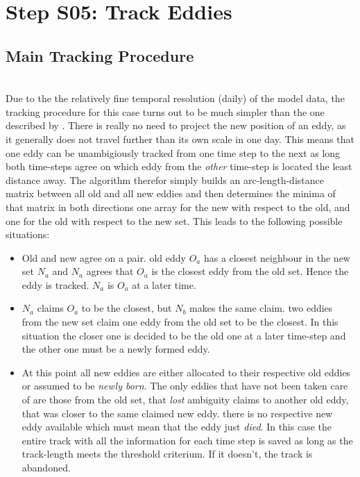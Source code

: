
\section{Step S05: Track Eddies} \label{S:05}
\subsection*{Main Tracking Procedure}
\\
Due to the the relatively fine temporal resolution (daily) of the model data,
the tracking procedure for this case turns out to be much simpler than the one described by
\cite{Chelton2007}. There is really no need to project the new position of an
eddy, as it generally does not travel further than its own scale in one day.
This means that one eddy can be unambigiously tracked from one time step to the
next as long both time-steps agree on which eddy from the \textit{other}
time-step is located the least distance away.
The algorithm therefor simply builds an arc-length-distance matrix
between all old and all new eddies and then determines the minima of that
matrix in both directions \ie one array for the new with respect to the old,
and one for the old with respect to the new set. This leads to the following
possible situations:
\begin{itemize}
\item
	Old and new agree on a pair. \Ie old eddy $O_a$ has a closest neighbour in
the new set $N_a$ and $N_a$ agrees that $O_a$ is the closest eddy from the old
set. Hence the eddy is tracked.  $N_a$ is $O_a$ at a later time.
\item
$N_a$ claims $O_a$ to be the closest, but $N_b$ makes the same claim. \Ie two
eddies from the new set claim one eddy from the old set to be the closest.
In this situation the closer one is decided to be the old one at a later
time-step and the other one must be a newly formed eddy.
\item
At this point all new eddies are either allocated to their respective old
eddies or assumed to be \textit{newly born}. The only eddies that have not been
taken care of are those from the old set, that \textit{lost} ambiguity claims to
another old eddy, that was closer to the same claimed new eddy. \Ie there is no
respective new eddy available which must mean that the eddy just \textit{died}.
In this case the entire track with all the information for each time step is
saved as long as the track-length meets the threshold criterium. If it doesn't,
the track is abandoned.
\end{itemize}
